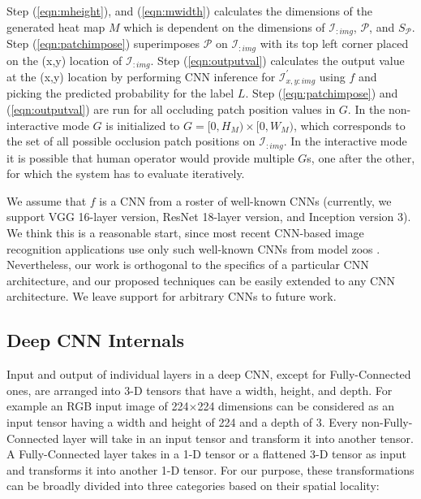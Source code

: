 Step (\ref{eqn:mheight}), and (\ref{eqn:mwidth}) calculates the dimensions of the generated heat map $M$ which is dependent on the dimensions of $\mathcal{I}_{:img}$, $\mathcal{P}$, and $S_\mathcal{P}$.
Step (\ref{eqn:patchimpose}) superimposes $\mathcal{P}$ on $\mathcal{I}_{:img}$ with its top left corner placed on the (x,y) location of $\mathcal{I}_{:img}$.
Step (\ref{eqn:outputval}) calculates the output value at the (x,y) location by performing CNN inference for $\mathcal{I}^{'}_{x,y:img}$ using $f$ and picking the predicted probability for the label $L$.
Step (\ref{eqn:patchimpose}) and (\ref{eqn:outputval}) are run for all occluding patch position values in $G$.
In the non-interactive mode $G$ is initialized to $G = [0, H_M) \times [0, W_M)$, which corresponds to the set of all possible occlusion patch positions on  $\mathcal{I}_{:img}$.
In the interactive mode it is possible that human operator would provide multiple $G$s, one after the other, for which the system has to evaluate iteratively.

We assume that $f$ is a CNN from a roster of well-known CNNs (currently, we support VGG 16-layer version, ResNet 18-layer version, and Inception version 3).
We think this is a reasonable start, since most recent CNN-based image recognition applications use only such well-known CNNs from model zoos \cite{caffemodelzoo, tfmodelzoo}.
Nevertheless, our work is orthogonal to the specifics of a particular CNN architecture, and our proposed techniques can be easily extended to any CNN architecture.
We leave support for arbitrary CNNs to future work.

\subsection{Deep CNN Internals}
Input and output of individual layers in a deep CNN, except for Fully-Connected ones, are arranged into 3-D tensors that have a width, height, and depth.
For example an RGB input image of 224$\times$224 dimensions can be considered as an input tensor having a width and height of 224 and a depth of 3.
Every non-Fully-Connected layer will take in an input tensor and transform it into another tensor.
A Fully-Connected layer takes in a 1-D tensor or a flattened 3-D tensor as input and transforms it into another 1-D tensor.
For our purpose, these transformations can be broadly divided into three categories based on their spatial locality:

